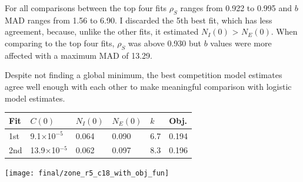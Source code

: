 For all comparisons between the top four fits \(\rho_{S}\) ranges from
0.922 to 0.995 and \(b\) MAD ranges from 1.56 to 6.90. I discarded the
5th best fit, which has less agreement, because, unlike the other
fits, it estimated \(N_{I}(0)\) > \(N_{E}(0)\). When comparing to the
top four fits, \(\rho_{S}\) was above 0.930 but \(b\) values were more
affected with a maximum MAD of 13.29.

Despite not finding a global minimum, the best competition model
estimates agree well enough with each other to make meaningful
comparison with logistic model estimates.

\begin{center}
  \begin{tabular}{l l l l l l}
    \hline
    Fit     & \(C(0)\)                    & \(N_{I}(0)\) & \(N_{E}(0)\) & \(k\) & Obj.\\
    \hline
    1st     & 9.1\(\times\)10\(^{-5}\)    & 0.064      & 0.090       & 6.7  & 0.194 \\
    2nd     & 13.9\(\times\)10\(^{-5}\)   & 0.062      & 0.097       & 8.3  & 0.196 \\
    \hline
  \end{tabular}
  \label{tab:P15_best_fit_params}
\end{center}


\graphicspath{{images/p15_fits/}}
\begin{Figure}
  \centering
  \texttt{[image: final/zone\_r5\_c18\_with\_obj\_fun]}
  \label{fig:comp_fit_zone}
\end{Figure}



